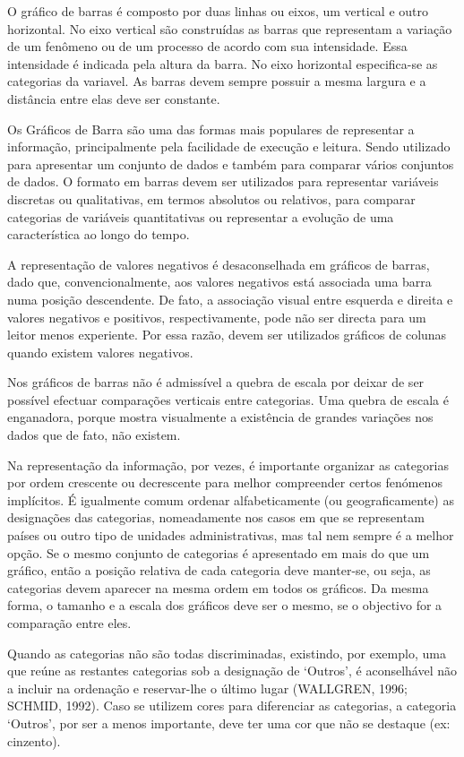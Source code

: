 \inic O gráfico de barras é composto por duas linhas ou eixos, um
vertical e outro horizontal. No eixo vertical são construídas as
barras que representam a variação de um fenômeno ou de um processo
de acordo com sua intensidade. Essa intensidade é indicada pela
altura da barra. No eixo horizontal especifica-se as categorias da
variavel. As barras devem sempre possuir a mesma largura e a
distância entre elas deve ser constante.\vskip0.3cm

Os Gráficos de Barra são uma das formas mais populares de representar a informação, principalmente pela facilidade de execução e leitura. Sendo utilizado para apresentar um conjunto de dados e também para comparar vários conjuntos de dados. O formato em barras devem ser utilizados para representar variáveis discretas ou qualitativas, em termos absolutos ou relativos, para comparar categorias de variáveis quantitativas ou representar a evolução de uma característica ao longo do tempo.\vskip0.3cm

A representação de valores negativos é desaconselhada em gráficos de barras, dado que, convencionalmente, aos valores negativos está associada uma barra numa posição descendente. De fato, a associação visual entre esquerda e direita e valores negativos e positivos, respectivamente, pode não ser directa para um leitor menos experiente. Por essa razão, devem ser utilizados gráficos de colunas quando existem valores negativos.\vskip0.3cm

Nos gráficos de barras não é admissível a quebra de escala por deixar de ser possível efectuar comparações verticais entre categorias. Uma quebra de escala é enganadora, porque mostra visualmente a existência de grandes variações nos dados que de fato, não existem.\vskip0.3cm 

Na representação da informação, por vezes, é importante organizar as categorias por ordem crescente ou decrescente para melhor compreender certos fenómenos implícitos. É igualmente comum ordenar alfabeticamente (ou geograficamente) as designações das categorias, nomeadamente nos casos em que se representam países ou outro tipo de unidades administrativas, mas tal nem sempre é a melhor opção. Se o mesmo conjunto de categorias é apresentado em mais do que um gráfico, então a posição relativa de cada categoria deve manter-se, ou seja, as categorias devem aparecer na mesma ordem em todos os gráficos. Da mesma forma, o tamanho e a escala dos gráficos deve ser o mesmo, se o objectivo for a comparação entre eles. \vskip0.3cm  

Quando as categorias não são todas discriminadas, existindo, por exemplo, uma que reúne as restantes categorias sob a designação de ‘Outros’, é aconselhável não a incluir na ordenação e reservar-lhe o último lugar (WALLGREN, 1996; SCHMID, 1992). Caso se utilizem cores para diferenciar as categorias, a categoria ‘Outros’, por ser a menos importante, deve ter uma cor que não se destaque (ex: cinzento). \vskip0.3cm


